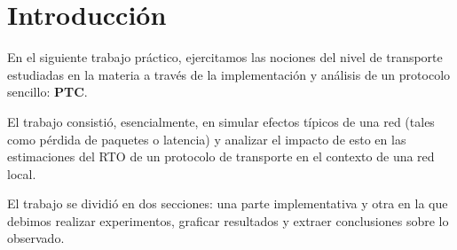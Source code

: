 \documentclass[10pt, a4paper]{article}
\author{Teor\'ia de las Comunicaciones, DC, UBA.}
\date{}
\title{}
\begin{document}
	
\thispagestyle{empty}

\maketitle

\tableofcontents
\newpage

\section{Introducción}
En el siguiente trabajo práctico, ejercitamos las nociones del nivel de transporte estudiadas en la materia a través de la implementación y análisis de un protocolo sencillo: \textbf{PTC}. 

El trabajo consistió, esencialmente, en simular efectos típicos de una red (tales como pérdida de paquetes o latencia) y analizar el impacto de esto en las estimaciones del RTO de un protocolo de transporte en el contexto de una red local. 

El trabajo se dividió en dos secciones: una parte implementativa y otra en la que debimos realizar experimentos, graficar resultados y extraer conclusiones sobre lo observado.
\end{document}
